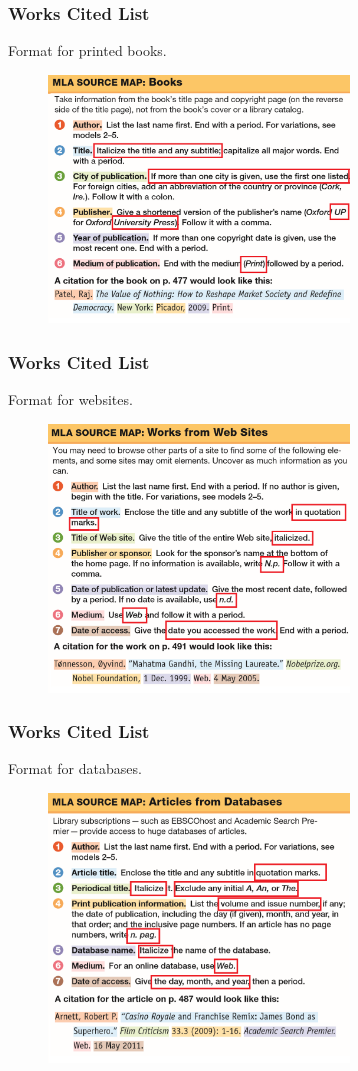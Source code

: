 \documentclass{beamer}
\begin{document}
\begin{frame}
\frametitle{Works Cited List}
Format for printed books.
\begin{figure}[!htbp]
\center
\includegraphics[width=8cm]{book.png}
\end{figure}
\end{frame}
\begin{frame}
\frametitle{Works Cited List}
Format for websites.
\begin{figure}[!htbp]
\center
\includegraphics[width=8cm]{web.png}
\end{figure}
\end{frame}
\begin{frame}
\frametitle{Works Cited List}
Format for databases.
\begin{figure}[!htbp]
\center
\includegraphics[width=8cm]{database.png}
\end{figure}
\end{frame}
\end{document}
